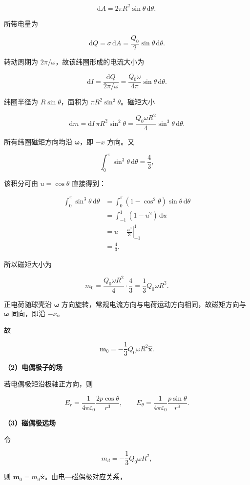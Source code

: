 \documentclass[12pt,a4paper,UTF8]{ctexart}
\begin{document}
\[\mathrm dA=2\pi R^2\sin\theta\,\mathrm d\theta,\]

所带电量为

\[\mathrm dQ=\sigma\,\mathrm dA
=\frac{Q_0}{2}\sin\theta\,\mathrm d\theta. \tag{2}\]

转动周期为 \(2\pi/\omega\)，故该纬圈形成的电流大小为

\[\mathrm dI=\frac{\mathrm dQ}{2\pi/\omega}
=\frac{Q_0\omega}{4\pi}\sin\theta\,\mathrm d\theta. \tag{3}\]

纬圈半径为 \(R\sin\theta\)，面积为 \(\pi R^2\sin^2\theta\)。磁矩大小

\[\mathrm dm=\mathrm dI\,\pi R^2\sin^2\theta
=\frac{Q_0\omega R^2}{4}\sin^3\theta\,\mathrm d\theta. \tag{4}\]

所有纬圈磁矩方向均沿 \(\boldsymbol\omega\)，即 \(-x\) 方向。又

\[\int_0^\pi\sin^3\theta\,\mathrm d\theta=\frac43,\]

该积分可由 \(u=\cos\theta\) 直接得到：

\[\begin{aligned}
\int_0^\pi\sin^3\theta\,\mathrm d\theta
&=\int_0^\pi(1-\cos^2\theta)\sin\theta\,\mathrm d\theta\\
&=\int_{-1}^{1}(1-u^2)\,\mathrm du\\
&=\left.u-\frac{u^3}{3}\right|_{-1}^{1}\\
&=\frac43.
\end{aligned}\]

所以磁矩大小为

\[m_0=\frac{Q_0\omega R^2}{4}\cdot\frac43
=\frac13Q_0\omega R^2.\]

正电荷随球壳沿 \(\boldsymbol\omega\)
方向旋转，常规电流方向与电荷运动方向相同，故磁矩方向与
\(\boldsymbol\omega\) 同向，即沿 \(-x\)。

故

\[\boxed{
\boldsymbol m_0=-\frac13Q_0\omega R^2\hat{\boldsymbol x}
}. \tag{5}\]

\textbf{（2）电偶极子的场}

若电偶极矩沿极轴正方向，则

\[\boxed{
E_r=\frac1{4\pi\varepsilon_0}\frac{2p\cos\theta}{r^3},
\qquad
E_\theta=\frac1{4\pi\varepsilon_0}\frac{p\sin\theta}{r^3}
}. \tag{6}\]

\textbf{（3）磁偶极远场}

令

\[m_d=-\frac13Q_0\omega R^2,\]

则 \(\boldsymbol m_0=m_d\hat{\boldsymbol x}\)。由电---磁偶极对应关系，
\end{document}
